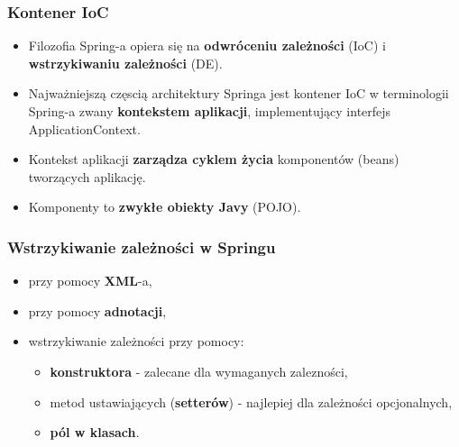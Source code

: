 \documentclass[../main.tex]{subfiles}
\begin{document}
    \subsubsection{Kontener IoC}
    \begin{itemize}
        \item Filozofia Spring-a opiera się na \textbf{odwróceniu zależności} (IoC) i \textbf{wstrzykiwaniu
        zależności} (DE).
        \item Najważniejszą częscią architektury Springa jest kontener IoC w
        terminologii Spring-a zwany \textbf{kontekstem aplikacji}, implementujący interfejs
        ApplicationContext.
        \item Kontekst aplikacji \textbf{zarządza cyklem życia} komponentów (beans) tworzących
        aplikację.
        \item Komponenty to \textbf{zwykłe obiekty Javy} (POJO).
    \end{itemize}

    \subsubsection{Wstrzykiwanie zależności w Springu}
    \begin{itemize}
        \item przy pomocy \textbf{XML}-a,
        \item przy pomocy \textbf{adnotacji},
        \item wstrzykiwanie zależności przy pomocy:
        \begin{itemize}
            \item \textbf{konstruktora} - zalecane dla wymaganych zalezności,
            \item metod ustawiających (\textbf{setterów}) - najlepiej dla zależności opcjonalnych,
            \item \textbf{pól w klasach}.
        \end{itemize}
    \end{itemize}
\end{document}
